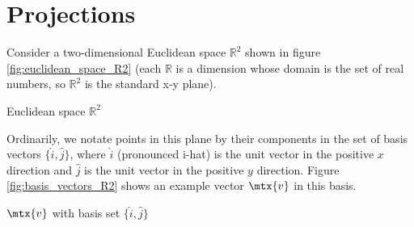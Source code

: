 \section{Projections}

Consider a two-dimensional Euclidean space $\mathbb{R}^2$ shown in figure
\ref{fig:euclidean_space_R2} (each $\mathbb{R}$ is a dimension whose domain is
the set of real numbers, so $\mathbb{R}^2$ is the standard x-y plane).

\begin{bookfigure}

  \caption{Euclidean space $\mathbb{R}^2$}
  \label{fig:euclidean_space_R2}
\end{bookfigure}

Ordinarily, we notate points in this plane by their components in the set of
basis vectors $\{\hat{i}, \hat{j}\}$, where $\hat{i}$ (pronounced i-hat) is the
unit vector in the positive $x$ direction and $\hat{j}$ is the unit vector in
the positive $y$ direction. Figure \ref{fig:basis_vectors_R2} shows an example
vector $\mtx{v}$ in this basis.

\begin{bookfigure}

  \caption{$\mtx{v}$ with basis set $\{\hat{i}, \hat{j}\}$}
  \label{fig:basis_vectors_R2}
\end{bookfigure}

